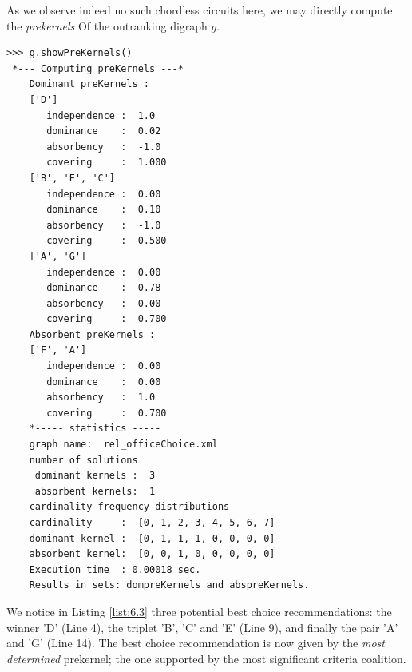 As we observe indeed no such chordless circuits here, we may directly compute the \emph{prekernels} Of the outranking digraph $g$.
\begin{lstlisting}[caption={Computing outranking and outranked prekernels},label=list:6.3]
>>> g.showPreKernels()
 *--- Computing preKernels ---*
    Dominant preKernels :
    ['D']
       independence :  1.0
       dominance    :  0.02
       absorbency   :  -1.0
       covering     :  1.000
    ['B', 'E', 'C']
       independence :  0.00
       dominance    :  0.10
       absorbency   :  -1.0
       covering     :  0.500
    ['A', 'G']
       independence :  0.00
       dominance    :  0.78
       absorbency   :  0.00
       covering     :  0.700
    Absorbent preKernels :
    ['F', 'A']
       independence :  0.00
       dominance    :  0.00
       absorbency   :  1.0
       covering     :  0.700
    *----- statistics -----
    graph name:  rel_officeChoice.xml
    number of solutions
     dominant kernels :  3
     absorbent kernels:  1
    cardinality frequency distributions
    cardinality     :  [0, 1, 2, 3, 4, 5, 6, 7]
    dominant kernel :  [0, 1, 1, 1, 0, 0, 0, 0]
    absorbent kernel:  [0, 0, 1, 0, 0, 0, 0, 0]
    Execution time  : 0.00018 sec.
    Results in sets: dompreKernels and abspreKernels.
\end{lstlisting}
We notice in Listing \ref{list:6.3} three potential best choice recommendations: the \Condorcet winner 'D' (Line 4), the triplet 'B', 'C' and 'E' (Line 9), and finally the pair 'A' and 'G' (Line 14). The best choice recommendation is now given by the \emph{most determined} prekernel; the one supported by the most significant criteria coalition.

